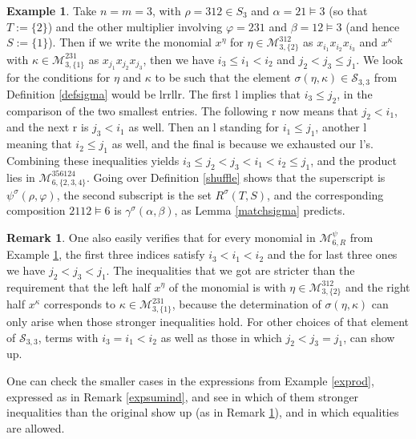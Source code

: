 \documentclass{article}
\theoremstyle{definition}
\newtheorem{rmk}[thm]{Remark}
\newtheorem{ex}[thm]{Example}
\begin{document}
\begin{ex}
Take $n=m=3$, with $\rho=312 \in S_{3}$ and $\alpha=21\vDash3$ (so that $T:=\{2\}$) and the other multiplier involving $\varphi=231$ and $\beta=12\vDash3$ (and hence $S:=\{1\}$). Then if we write the monomial $x^{\eta}$ for $\eta\in\mathcal{M}_{3,\{2\}}^{312}$ as $x_{i_{1}}x_{i_{2}}x_{i_{3}}$ and $x^{\kappa}$ with $\kappa\in\mathcal{M}_{3,\{1\}}^{231}$ as $x_{j_{1}}x_{j_{2}}x_{j_{3}}$, then we have $i_{3} \leq i_{1}<i_{2}$ and $j_{2}<j_{3} \leq j_{1}$. We look for the conditions for $\eta$ and $\kappa$ to be such that the element $\sigma(\eta,\kappa)\in\mathcal{S}_{3,3}$ from Definition \ref{defsigma} would be lrrllr. The first l implies that $i_{3} \leq j_{2}$, in the comparison of the two smallest entries. The following r now means that $j_{2}<i_{1}$, and the next r is $j_{3}<i_{1}$ as well. Then an l standing for $i_{1} \leq j_{1}$, another l meaning that $i_{2} \leq j_{1}$ as well, and the final is because we exhausted our l's. Combining these inequalities yields $i_{3} \leq j_{2}<j_{3}<i_{1}<i_{2} \leq j_{1}$, and the product lies in $\mathcal{M}_{6,\{2,3,4\}}^{356124}$. Going over Definition \ref{shuffle} shows that the superscript is $\psi^{\sigma}(\rho,\varphi)$, the second subscript is the set $R^{\sigma}(T,S)$, and the corresponding composition $2112\vDash6$ is $\gamma^{\sigma}(\alpha,\beta)$, as Lemma \ref{matchsigma} predicts. \label{exsigma}
\end{ex}

\begin{rmk}
One also easily verifies that for every monomial in $\mathcal{M}_{6,R}^{\psi}$ from Example \ref{exsigma}, the first three indices satisfy $i_{3}<i_{1}<i_{2}$ and the for last three ones we have $j_{2}<j_{3}<j_{1}$. The inequalities that we got are stricter than the requirement that the left half $x^{\eta}$ of the monomial is with $\eta\in\mathcal{M}_{3,\{2\}}^{312}$ and the right half $x^{\kappa}$ corresponds to $\kappa\in\mathcal{M}_{3,\{1\}}^{231}$, because the determination of $\sigma(\eta,\kappa)$ can only arise when those stronger inequalities hold. For other choices of that element of $\mathcal{S}_{3,3}$, terms with $i_{3}=i_{1}<i_{2}$ as well as those in which $j_{2}<j_{3}=j_{1}$, can show up. \label{strongineq}
\end{rmk}
One can check the smaller cases in the expressions from Example \ref{exprod}, expressed as in Remark \ref{expsumind}, and see in which of them stronger inequalities than the original show up (as in Remark \ref{strongineq}), and in which equalities are allowed.
\end{document}
